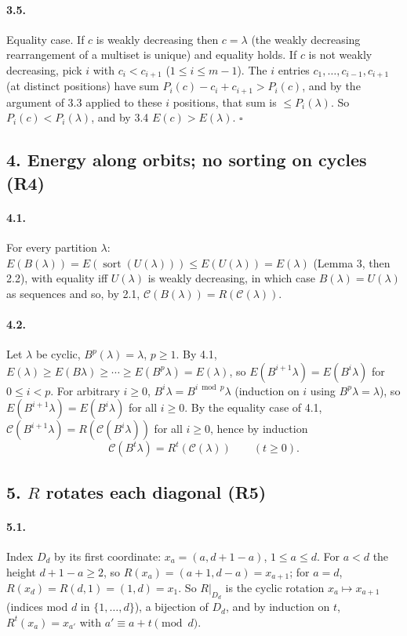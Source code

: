 \documentclass[11pt]{article}
\begin{document}
\paragraph{3.5.} Equality case. If $c$ is weakly decreasing then $c=\lambda$ (the weakly decreasing rearrangement
of a multiset is unique) and equality holds. If $c$ is not weakly decreasing, pick $i$ with $c_i<c_{i+1}$
($1\le i\le m-1$). The $i$ entries $c_1,\ldots,c_{i-1},c_{i+1}$ (at distinct positions) have sum
$P_i(c)-c_i+c_{i+1}>P_i(c)$, and by the argument of 3.3 applied to these $i$ positions, that sum is
$\le P_i(\lambda)$. So $P_i(c)<P_i(\lambda)$, and by 3.4 $E(c)>E(\lambda)$. $\square$

\subsection*{4. Energy along orbits; no sorting on cycles (R4)}

\paragraph{4.1.} For every partition $\lambda$:
$E(B(\lambda))=E(\operatorname{sort}(U(\lambda)))\le E(U(\lambda))=E(\lambda)$ (Lemma 3, then 2.2), with equality
iff $U(\lambda)$ is weakly decreasing, in which case $B(\lambda)=U(\lambda)$ as sequences and so, by 2.1,
$\mathcal C(B(\lambda))=R(\mathcal C(\lambda))$.

\paragraph{4.2.} Let $\lambda$ be cyclic, $B^p(\lambda)=\lambda$, $p\ge1$. By 4.1,
$E(\lambda)\ge E(B\lambda)\ge\cdots\ge E(B^p\lambda)=E(\lambda)$, so $E(B^{i+1}\lambda)=E(B^i\lambda)$ for
$0\le i<p$. For arbitrary $i\ge0$, $B^i\lambda=B^{i\bmod p}\lambda$ (induction on $i$ using $B^p\lambda=\lambda$),
so $E(B^{i+1}\lambda)=E(B^i\lambda)$ for all $i\ge0$. By the equality case of 4.1,
$\mathcal C(B^{i+1}\lambda)=R(\mathcal C(B^i\lambda))$ for all $i\ge0$, hence by induction
\[
\mathcal C(B^t\lambda)=R^t(\mathcal C(\lambda))\qquad(t\ge0).
\]

\subsection*{5. $R$ rotates each diagonal (R5)}

\paragraph{5.1.} Index $D_d$ by its first coordinate: $x_a=(a,d+1-a)$, $1\le a\le d$. For $a<d$ the height
$d+1-a\ge2$, so $R(x_a)=(a+1,d-a)=x_{a+1}$; for $a=d$, $R(x_d)=R(d,1)=(1,d)=x_1$. So $R|_{D_d}$ is the cyclic
rotation $x_a\mapsto x_{a+1}$ (indices mod $d$ in $\{1,\ldots,d\}$), a bijection of $D_d$, and by induction on
$t$, $R^t(x_a)=x_{a'}$ with $a'\equiv a+t\pmod d$.
\end{document}
